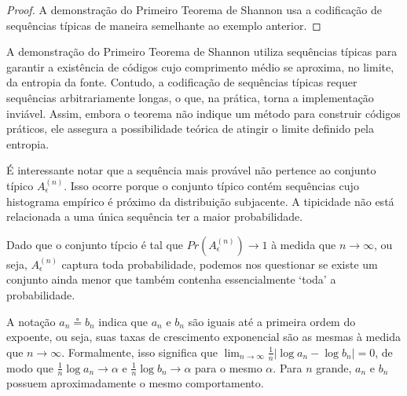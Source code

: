 \begin{proof}
  A demonstração do Primeiro Teorema de Shannon usa a codificação de sequências típicas de maneira semelhante ao
  exemplo anterior.
\end{proof}

A demonstração do Primeiro Teorema de Shannon utiliza sequências típicas para
garantir a existência de códigos cujo comprimento médio se aproxima, no limite,
da entropia da fonte. Contudo, a codificação de sequências típicas requer
sequências arbitrariamente longas, o que, na prática, torna a implementação
inviável. Assim, embora o teorema não indique um método para construir códigos
práticos, ele assegura a possibilidade teórica de atingir o limite definido
pela entropia.

É interessante notar que a sequência mais provável não pertence ao conjunto
típico $A_\epsilon^{(n)}$. Isso ocorre porque o conjunto típico contém
sequências cujo histograma empírico é próximo da distribuição subjacente. A
tipicidade não está relacionada a uma única sequência ter a maior probabilidade.

Dado que o conjunto típcio é tal que $Pr(A_\epsilon^{(n)}) \to 1$ à medida que
$n \to \infty$, ou seja, $A_\epsilon^{(n)}$ captura toda probabilidade, podemos
nos questionar se existe um conjunto ainda menor que também contenha
essencialmente `toda' a probabilidade.

\begin{definition}\label{def:saiapoe}
A notação $a_n \circeq b_n$ indica que $a_n$ e $b_n$ são iguais até a primeira ordem do expoente,
ou seja, suas taxas de crescimento exponencial são as mesmas à medida que $n \to \infty$. 
Formalmente, isso significa que $\lim_{n \to \infty} \frac{1}{n} |\log a_n - \log b_n| = 0$, 
de modo que $\frac{1}{n} \log a_n \to \alpha$ e $\frac{1}{n} \log b_n \to \alpha$ 
para o mesmo $\alpha$. Para $n$ grande, $a_n$ e $b_n$ possuem aproximadamente o mesmo comportamento. 
\end{definition}

